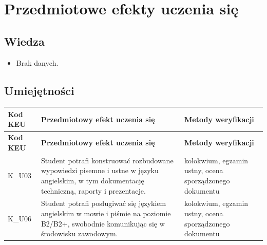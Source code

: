 \documentclass[12pt, a4paper]{article}
\newcommand{\thdrule}{\noalign{\global\setlength{\extrarowheight}{0pt}}}
\newcommand{\thdend}{\noalign{\global\setlength{\extrarowheight}{3pt}}}
\begin{document}
\section{Przedmiotowe efekty uczenia się}

\subsection*{Wiedza}
\begin{itemize}
  \item Brak danych.
\end{itemize}

\subsection*{Umiejętności}
{\scriptsize
\begin{longtable}{m{1.6cm}m{9.0cm}m{4.2cm}}
\thdrule\toprule
\rowcolor{pjatkRed} {\color{white}\footnotesize\textbf{\vphantom{Ag}Kod KEU}} & {\color{white}\footnotesize\textbf{\vphantom{Ag}Przedmiotowy efekt uczenia się}} & {\color{white}\footnotesize\textbf{\vphantom{Ag}Metody weryfikacji}} \\
\midrule\thdend
\endfirsthead
\thdrule\toprule
\rowcolor{pjatkRed} {\color{white}\footnotesize\textbf{\vphantom{Ag}Kod KEU}} & {\color{white}\footnotesize\textbf{\vphantom{Ag}Przedmiotowy efekt uczenia się}} & {\color{white}\footnotesize\textbf{\vphantom{Ag}Metody weryfikacji}} \\
\midrule\thdend
\endhead
  \rowcolor{tableRowLight} K\_U03 & Student potrafi konstruować rozbudowane wypowiedzi pisemne i ustne w języku angielskim, w tym dokumentację techniczną, raporty i prezentacje. & kolokwium, egzamin ustny, ocena sporządzonego dokumentu \\
  \rowcolor{tableRowAlt} K\_U06 & Student potrafi posługiwać się językiem angielskim w mowie i piśmie na poziomie B2/B2+, swobodnie komunikując się w środowisku zawodowym. & kolokwium, egzamin ustny, ocena sporządzonego dokumentu \\
\bottomrule
\end{longtable}}
\end{document}
